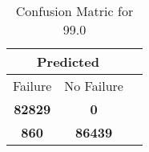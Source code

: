\begin{table}[] 
\caption{Confusion Matric for 99.0} 
\label{Table: Prediction Accuracy-DMD99.0OnlySunEKF-ignoreReflectionperfectNoFailurePrediction-Reflection} 
\centering 
\begin{tabular} 
 {@{}ccc@{}} 
\toprule 
\multicolumn{2}{c}{\textbf{Predicted}}
 \\ \midrule 
\multicolumn{1}{|c|}{Failure} & 
\multicolumn{1}{c|}{No Failure}
 \\ \midrule 
\multicolumn{1}{|c|}{\color{green}\textbf{82829}} & 
\multicolumn{1}{c|}{\color{red}\textbf{0}}
 \\ \midrule 
\multicolumn{1}{|c|}{\color{red}\textbf{860}} & 
\multicolumn{1}{c|}{\color{green}\textbf{86439}}
 \\ \bottomrule 
\end{tabular} 
\end{table} 
